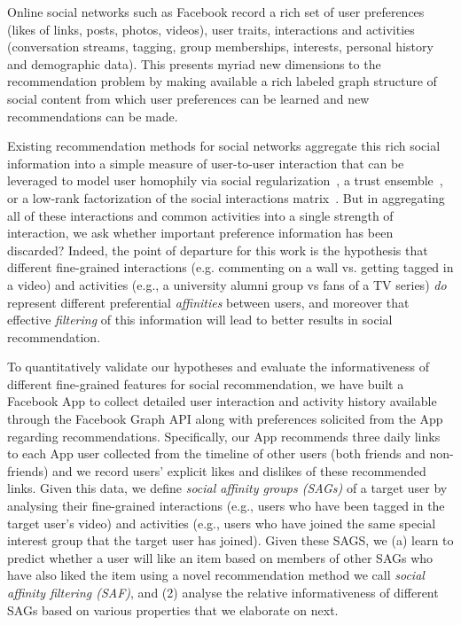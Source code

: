 
\label{sec:introduction}

Online social networks such as Facebook record a rich set of user
preferences (likes of links, posts, photos, videos), user traits,
interactions and activities (conversation streams, tagging, group
memberships, interests, personal history and demographic data).  
This presents myriad new
dimensions to the recommendation problem by making available a rich
labeled graph structure of social content from which user preferences
can be learned and new recommendations can be made.  

Existing recommendation methods for social networks aggregate this
rich social information into a simple measure of user-to-user interaction 
that can be leveraged to model user homophily via social
regularization~\cite{lla,socinf,sr,rrmf, Noel2012NOF}, a trust
ensemble~\cite{ste}, or a low-rank factorization of the social
interactions matrix~\cite{sorec}.  But in aggregating all of these
interactions and common activities into a single strength of
interaction, we ask whether important preference information has been
discarded?  Indeed, the point of departure for this work is the
hypothesis that different fine-grained interactions (e.g. commenting
on a wall vs. getting tagged in a video) and activities (e.g., a
university alumni group vs fans of a TV series) \emph{do} represent different
preferential {\em affinities} between users, and moreover that effective
{\em filtering} of this information will lead to better results in
social recommendation.


To quantitatively validate our hypotheses and evaluate the
informativeness of different fine-grained features for social
recommendation, we have built a Facebook App to collect detailed user
interaction and activity history available through the Facebook Graph
API along with preferences solicited from the App regarding recommendations.
Specifically, our App recommends three daily links to each
App user collected from the timeline of other users (both friends and
non-friends) and we record users' explicit likes and dislikes of these
recommended links.  Given this data, we define \emph{social affinity
groups (SAGs)} of a target user by analysing their fine-grained
interactions (e.g., users who have been tagged in the target user's
video) and activities (e.g., users who have joined the same special
interest group that the target user has joined).  Given these SAGS, we
(a) learn to predict whether a user will like an item based on members
of other SAGs who have also liked the item using a novel
recommendation method we call {\em social affinity filtering (SAF)},
and (2) analyse the relative informativeness of different SAGs based
on various properties that we elaborate on next.

